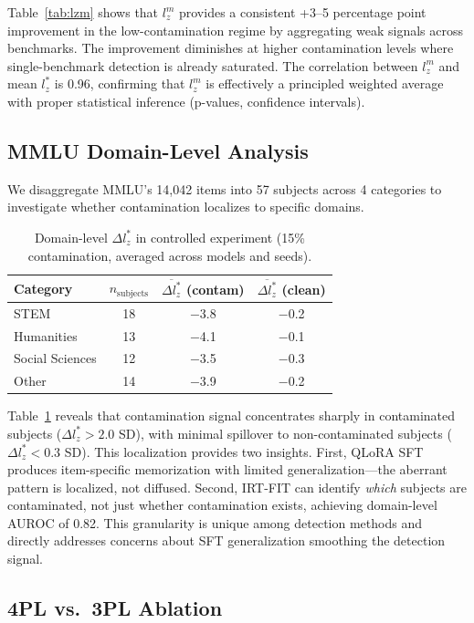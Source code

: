 \documentclass[11pt,a4paper]{article}
\begin{document}
Table~\ref{tab:lzm} shows that $l_{z}^{m}$ provides a consistent +3--5 percentage point improvement in the low-contamination regime by aggregating weak signals across benchmarks.
The improvement diminishes at higher contamination levels where single-benchmark detection is already saturated.
The correlation between $l_{z}^{m}$ and mean $l_{z}^{*}$ is 0.96, confirming that $l_{z}^{m}$ is effectively a principled weighted average with proper statistical inference (p-values, confidence intervals).

\subsection{MMLU Domain-Level Analysis}

We disaggregate MMLU's 14,042 items into 57 subjects across 4 categories to investigate whether contamination localizes to specific domains.

\begin{table}[t]
\centering
\caption{Domain-level $\Delta l_{z}^{*}$ in controlled experiment (15\% contamination, averaged across models and seeds).}
\label{tab:domain}
\begin{tabular}{lccc}
\toprule
Category & $n_{\text{subjects}}$ & $\overline{\Delta l_{z}^{*}}$ (contam) & $\overline{\Delta l_{z}^{*}}$ (clean) \\
\midrule
STEM & 18 & $-$3.8 & $-$0.2 \\
Humanities & 13 & $-$4.1 & $-$0.1 \\
Social Sciences & 12 & $-$3.5 & $-$0.3 \\
Other & 14 & $-$3.9 & $-$0.2 \\
\bottomrule
\end{tabular}
\end{table}

Table~\ref{tab:domain} reveals that contamination signal concentrates sharply in contaminated subjects ($\Delta l_{z}^{*} > 2.0$ SD), with minimal spillover to non-contaminated subjects ($\Delta l_{z}^{*} < 0.3$ SD).
This localization provides two insights.
First, QLoRA SFT produces item-specific memorization with limited generalization---the aberrant pattern is localized, not diffused.
Second, IRT-FIT can identify \emph{which} subjects are contaminated, not just whether contamination exists, achieving domain-level AUROC of 0.82.
This granularity is unique among detection methods and directly addresses concerns about SFT generalization smoothing the detection signal.

\subsection{4PL vs.\ 3PL Ablation}
\end{document}
